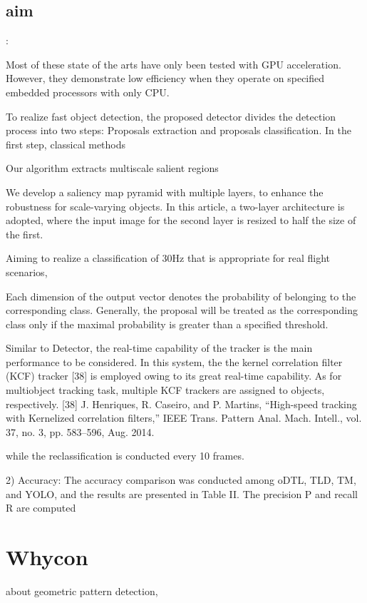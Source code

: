 \documentclass[a4paper]{report}
\begin{document}
\subsection{aim}:

Most of these state of the arts have only been tested with GPU acceleration. However,
they demonstrate low efficiency when they operate on specified embedded processors with only CPU.

To realize fast object detection, the proposed detector divides the detection process into two steps: Proposals extraction and proposals classification. In the first step, classical methods

Our algorithm extracts multiscale salient regions

We develop a saliency map pyramid with multiple layers, to enhance the robustness for
scale-varying objects. In this article, a two-layer architecture is adopted, where the input image for the second layer is resized to half the size of the first.

Aiming to realize a classification of 30Hz that is appropriate for real flight scenarios,

Each dimension of the output vector denotes the probability of
belonging to the corresponding class. Generally, the proposal
will be treated as the corresponding class only if the maximal
probability is greater than a specified threshold.

Similar to Detector, the real-time capability of the tracker is
the main performance to be considered. In this system, the the
kernel correlation filter (KCF) tracker [38] is employed owing
to its great real-time capability. As for multiobject tracking task,
multiple KCF trackers are assigned to objects, respectively.
[38] J. Henriques, R. Caseiro, and P. Martins, “High-speed tracking with
Kernelized correlation filters,” IEEE Trans. Pattern Anal. Mach. Intell.,
vol. 37, no. 3, pp. 583–596, Aug. 2014.

while the reclassification is conducted every 10 frames.

2) Accuracy: The accuracy comparison was conducted
among oDTL, TLD, TM, and YOLO, and the results are presented
in Table II. The precision P and recall R are computed

\section{Whycon}
about geometric pattern detection,
\end{document}

